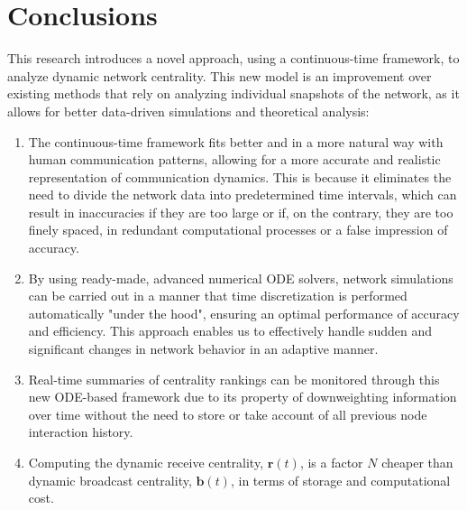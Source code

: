 
\chapter{Conclusions}
\label{chap:concl}

This research introduces a novel approach, using a continuous-time framework, to analyze dynamic network centrality. This new model is an improvement over existing methods that rely on analyzing individual snapshots of the network, as it allows for better data-driven simulations and theoretical analysis:

\begin{enumerate}[label=(\roman*)]
  \item The continuous-time framework fits better and in a more natural way with human communication patterns, allowing for a more accurate and realistic representation of communication dynamics. This is because it eliminates the need to divide the network data into predetermined time intervals, which can result in inaccuracies if they are too large or if, on the contrary, they are too finely spaced, in redundant computational processes or a false impression of accuracy.
  \item By using ready-made, advanced numerical ODE solvers, network simulations can be carried out in a manner that time discretization is performed automatically "under the hood", ensuring an optimal performance of accuracy and efficiency. This approach enables us to effectively handle sudden and significant changes in network behavior in an adaptive manner.
  \item Real-time summaries of centrality rankings can be monitored through this new ODE-based framework due to its property of downweighting information over time without the need to store or take account of all previous node interaction history.
  \item Computing the dynamic receive centrality, $\mathbf{r}(t)$, is a factor $N$ cheaper than dynamic broadcast centrality, $\mathbf{b}(t)$, in terms of storage and computational cost.
\end{enumerate}







